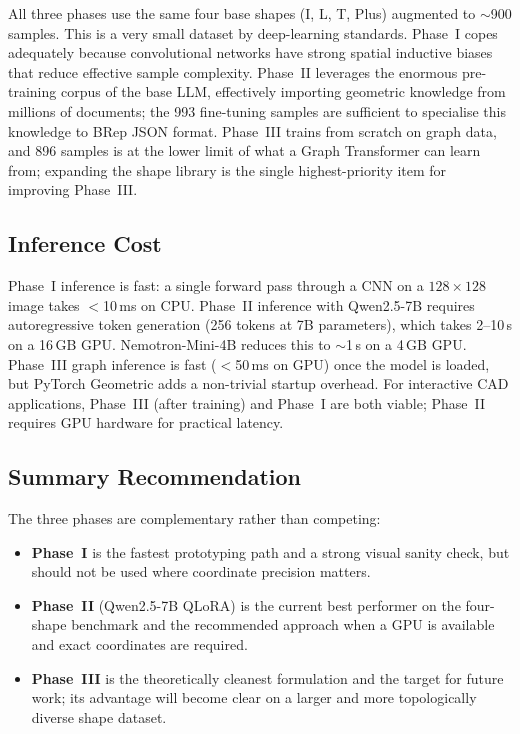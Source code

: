 \documentclass[journal]{IEEEtran}
\begin{document}
All three phases use the same four base shapes (I, L, T, Plus) augmented to
$\sim$900 samples.  This is a very small dataset by deep-learning standards.
Phase~I copes adequately because convolutional networks have strong
spatial inductive biases that reduce effective sample complexity.  Phase~II
leverages the enormous pre-training corpus of the base LLM, effectively
importing geometric knowledge from millions of documents; the 993 fine-tuning
samples are sufficient to specialise this knowledge to BRep JSON format.
Phase~III trains from scratch on graph data, and 896 samples is at the lower
limit of what a Graph Transformer can learn from; expanding the shape library
is the single highest-priority item for improving Phase~III.

\subsection{Inference Cost}

Phase~I inference is fast: a single forward pass through a CNN on a
$128 \times 128$ image takes $<$10\,ms on CPU.  Phase~II inference with
Qwen2.5-7B requires autoregressive token generation (256 tokens at 7B
parameters), which takes 2--10\,s on a 16\,GB GPU.  Nemotron-Mini-4B reduces
this to $\sim$1\,s on a 4\,GB GPU.  Phase~III graph inference is fast
($<$50\,ms on GPU) once the model is loaded, but PyTorch Geometric adds a
non-trivial startup overhead.  For interactive CAD applications, Phase~III
(after training) and Phase~I are both viable; Phase~II requires GPU hardware
for practical latency.

\subsection{Summary Recommendation}

The three phases are complementary rather than competing:
\begin{itemize}
  \item \textbf{Phase~I} is the fastest prototyping path and a strong visual
        sanity check, but should not be used where coordinate precision matters.
  \item \textbf{Phase~II} (Qwen2.5-7B QLoRA) is the current best performer on
        the four-shape benchmark and the recommended approach when a GPU is
        available and exact coordinates are required.
  \item \textbf{Phase~III} is the theoretically cleanest formulation and the
        target for future work; its advantage will become clear on a larger and
        more topologically diverse shape dataset.
\end{itemize}
\end{document}
